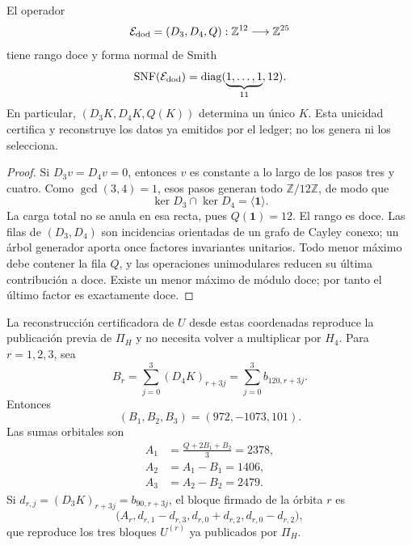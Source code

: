 \begin{theorem}
\label{p12-83-c10-s1:thm:completitud-extractor-transversal-k}
El operador
\[
 \mathcal E_{\rm dod}=(D_3,D_4,Q):
 \mathbb Z^{12}\longrightarrow\mathbb Z^{25}
\]
tiene rango doce y forma normal de Smith
\begin{equation}
 \operatorname{SNF}(\mathcal E_{\rm dod})
 =\operatorname{diag}(\underbrace{1,\ldots,1}_{11},12).
 \label{p12-83-c10-s1:eq:snf-extractor-transversal-k}
\end{equation}
En particular, \((D_3K,D_4K,Q(K))\) determina un único \(K\). Esta
unicidad certifica y reconstruye los datos ya emitidos por el ledger; no los
genera ni los selecciona.
\end{theorem}

\begin{proof}
Si \(D_3v=D_4v=0\), entonces \(v\) es constante a lo largo de los pasos
tres y cuatro. Como \(\gcd(3,4)=1\), esos pasos generan todo
\(\mathbb Z/12\mathbb Z\), de modo que
\[
 \ker D_3\cap\ker D_4=\langle\mathbf1\rangle.
\]
La carga total no se anula en esa recta, pues \(Q(\mathbf1)=12\). El rango
es doce. Las filas de \((D_3,D_4)\) son incidencias orientadas de un grafo
de Cayley conexo; un árbol generador aporta once factores invariantes
unitarios. Todo menor máximo debe contener la fila \(Q\), y las operaciones
unimodulares reducen su última contribución a doce. Existe un menor máximo de
módulo doce; por tanto el último factor es exactamente doce.
\end{proof}

La reconstrucción certificadora de \(U\) desde estas coordenadas reproduce la
publicación previa de \(\Pi_H\) y no necesita volver a multiplicar por
\(H_4\). Para \(r=1,2,3\), sea
\begin{equation}
 B_r=\sum_{j=0}^{3}(D_4K)_{r+3j}
 =\sum_{j=0}^{3}b_{120,r+3j}.
 \label{p12-83-c10-s1:eq:br-diferencias-k}
\end{equation}
Entonces
\[
 (B_1,B_2,B_3)=(972,-1073,101).
\]
Las sumas orbitales son
\begin{align}
 A_1&=\frac{Q+2B_1+B_2}{3}=2378,
 \label{p12-83-c10-s1:eq:a1-reconstruccion-u}\\
 A_2&=A_1-B_1=1406,
 \label{p12-83-c10-s1:eq:a2-reconstruccion-u}\\
 A_3&=A_2-B_2=2479.
 \label{p12-83-c10-s1:eq:a3-reconstruccion-u}
\end{align}
Si \(d_{r,j}=(D_3K)_{r+3j}=b_{90,r+3j}\), el bloque firmado de la órbita
\(r\) es
\begin{equation}
 \bigl(A_r,
 d_{r,1}-d_{r,3},
 d_{r,0}+d_{r,2},
 d_{r,0}-d_{r,2}\bigr),
 \label{p12-83-c10-s1:eq:bloque-firmado-desde-diferencias}
\end{equation}
que reproduce los tres bloques \(U^{(r)}\) ya publicados por \(\Pi_H\).

